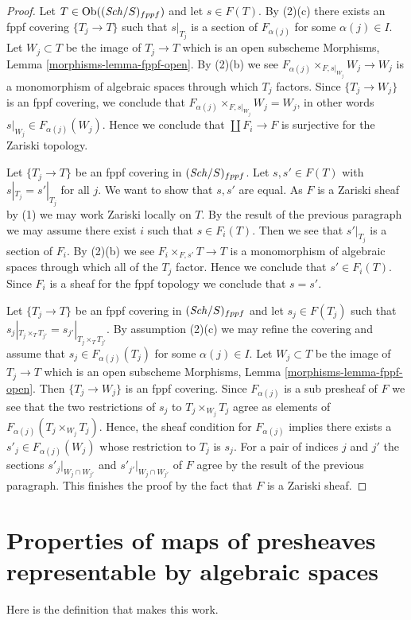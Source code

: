 \begin{proof}
Let $T \in \operatorname{Ob}((\mathit{Sch}/S)_{fppf})$ and let $s \in F(T)$. By (2)(c)
there exists an fppf covering $\{T_j \to T\}$ such that
$s|_{T_j}$ is a section of $F_{\alpha(j)}$ for some $\alpha(j) \in I$.
Let $W_j \subset T$ be the image of $T_j \to T$
which is an open subscheme Morphisms, Lemma \ref{morphisms-lemma-fppf-open}.
By (2)(b) we see
$F_{\alpha(j)} \times_{F, s|_{W_j}} W_j \to W_j$ is a monomorphism
of algebraic spaces through which $T_j$ factors. Since $\{T_j \to W_j\}$
is an fppf covering, we conclude that
$F_{\alpha(j)} \times_{F, s|_{W_j}} W_j = W_j$, in other words
$s|_{W_j} \in F_{\alpha(j)}(W_j)$. Hence we conclude that
$\coprod F_i \to F$ is surjective for the Zariski topology.

\medskip\noindent
Let $\{T_j \to T\}$ be an fppf covering in $(\mathit{Sch}/S)_{fppf}$.
Let $s, s' \in F(T)$ with $s|_{T_j} = s'|_{T_j}$ for all $j$.
We want to show that $s, s'$ are equal. As $F$ is a Zariski sheaf by (1)
we may work Zariski locally on $T$. By the result of the previous paragraph
we may assume there exist $i$ such that $s \in F_i(T)$. Then we see that
$s'|_{T_j}$ is a section of $F_i$. By (2)(b) we see
$F_{i} \times_{F, s'} T \to T$ is a monomorphism of algebraic spaces
through which all of the $T_j$ factor. Hence we conclude that
$s' \in F_i(T)$. Since $F_i$ is a sheaf for the fppf topology
we conclude that $s = s'$.

\medskip\noindent
Let $\{T_j \to T\}$ be an fppf covering in $(\mathit{Sch}/S)_{fppf}$ and let
$s_j \in F(T_j)$ such that
$s_j|_{T_j \times_T T_{j'}} = s_{j'}|_{T_j \times_T T_{j'}}$. By assumption
(2)(c) we may refine the covering and assume that $s_j \in F_{\alpha(j)}(T_j)$
for some $\alpha(j) \in I$. Let $W_j \subset T$ be the image of $T_j \to T$
which is an open subscheme Morphisms, Lemma \ref{morphisms-lemma-fppf-open}.
Then $\{T_j \to W_j\}$ is an fppf covering. Since $F_{\alpha(j)}$ is a sub
presheaf of $F$ we see that the two restrictions of $s_j$ to
$T_j \times_{W_j} T_j$ agree as elements of
$F_{\alpha(j)}(T_j \times_{W_j} T_j)$. Hence, the sheaf condition for
$F_{\alpha(j)}$ implies there exists a $s'_j \in F_{\alpha(j)}(W_j)$
whose restriction to $T_j$ is $s_j$. For a pair of indices
$j$ and $j'$ the sections $s'_j|_{W_j \cap W_{j'}}$ and
$s'_{j'}|_{W_j \cap W_{j'}}$ of $F$ agree by the result of the
previous paragraph. This finishes the proof by the fact that
$F$ is a Zariski sheaf.
\end{proof}

\section{Properties of maps of presheaves representable by algebraic spaces}
\label{bootstrap-section-representable-by-spaces-properties}
Here is the definition that makes this work.

